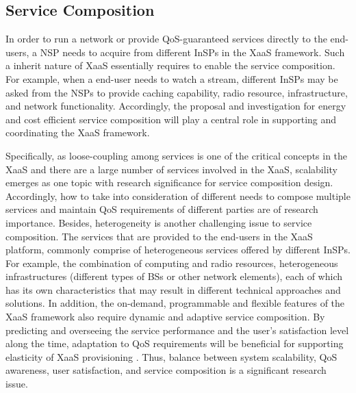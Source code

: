 \documentclass[12pt,draftclsnofoot,onecolumn]{IEEEtran}
\begin{document}
\subsection{Service Composition}
In order to run a network or provide QoS-guaranteed services
directly to the end-users, a NSP needs to acquire from different
InSPs in the XaaS framework. Such a inherit nature of XaaS
essentially requires to enable the service composition. For
example, when a end-user needs to watch a stream, different InSPs
may be asked from the NSPs to provide caching capability, radio
resource, infrastructure, and network functionality. Accordingly,
the proposal and investigation for energy and cost efficient
service composition will play a central role in supporting and
coordinating the XaaS framework.\par

Specifically, as loose-coupling among services is one of the
critical concepts in the XaaS and there are a large number of
services involved in the XaaS, scalability emerges as one topic
with research significance for service composition design.
Accordingly, how to take into consideration of different needs to
compose multiple services and maintain QoS requirements of
different parties are of research importance. Besides,
heterogeneity is another challenging issue to service composition.
The services that are provided to the end-users in the XaaS
platform, commonly comprise of heterogeneous services offered by
different InSPs. For example, the combination of computing and
radio resources, heterogeneous infrastructures (different types of
BSs or other network elements), each of which has its own
characteristics that may result in different technical approaches
and solutions. In addition, the on-demand, programmable and
flexible features of the XaaS framework also require dynamic and
adaptive service composition. By predicting and overseeing the
service performance and the user's satisfaction level along the
time, adaptation to QoS requirements will be beneficial for
supporting elasticity of XaaS provisioning \cite{Duan1}. Thus,
balance between system scalability, QoS awareness, user
satisfaction, and service composition is a significant research
issue.
\end{document}
